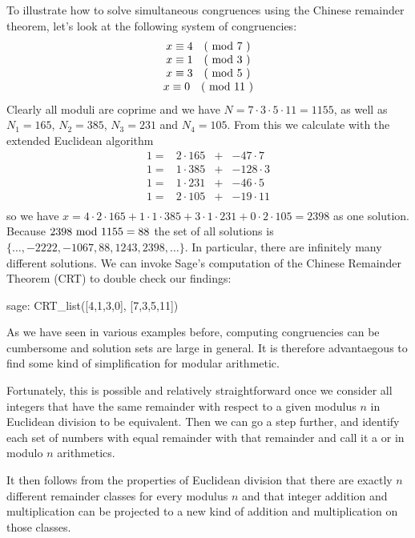 \begin{example} To illustrate how to solve simultaneous congruences using the Chinese remainder theorem, let's look at the following system of congruencies:
$$
\begin{array}{c}
x \equiv 4 \quad \text{( mod } 7 \text{ )} \\
x \equiv 1 \quad \text{( mod } 3 \text{ )} \\
x \equiv 3 \quad \text{( mod } 5 \text{ )} \\
x \equiv 0 \quad \text{( mod } 11 \text{ )} \\
\end{array}
$$
Clearly all moduli are coprime and we have $ N = 7 \cdot 3 \cdot 5 \cdot 11 = 1155 $, as well as
$ N_1 = 165 $, $ N_2 = 385 $, $ N_3 = 231 $ and $ N_4 = 105 $. From this we calculate with the extended Euclidean algorithm
$$
\begin{array}{cccc}
 1 = & 2 \cdot 165  & + & -47 \cdot 7 \\
 1 = & 1 \cdot 385  & + &  -128 \cdot 3 \\
 1 = & 1 \cdot 231  & + &  -46 \cdot 5 \\
 1 = & 2 \cdot 105  & + &  -19 \cdot 11 \\
\end{array}
$$
so we have
$x = 4 \cdot 2 \cdot 165 + 1 \cdot 1 \cdot 385 + 3 \cdot 1 \cdot 231 + 0 \cdot 2 \cdot 105 = 2398$
as one solution. Because $ 2398 \text{ mod } 1155 = 88 $ the set of all solutions is
$ \{\ldots, -2222, -1067,88,1243, 2398, \ldots \} $. In particular, there are infinitely many different solutions. We can invoke Sage's computation of the Chinese Remainder Theorem (CRT) to double check our findings:
\begin{sagecommandline}
sage: CRT_list([4,1,3,0], [7,3,5,11])
\end{sagecommandline}
\end{example}
As we have seen in various examples before, computing congruencies can be cumbersome and solution sets are large in general. It is therefore advantaegous to find some kind of simplification for modular arithmetic. 

Fortunately, this is possible and relatively straightforward once we consider all integers that have the same remainder with respect to a given modulus $n$ in Euclidean division to be equivalent. Then we can go a step further, and identify each set of numbers with equal remainder with that remainder and call it a  or  in modulo $n$ arithmetics. 

It then follows from the properties of Euclidean division that there are exactly $ n $ different remainder classes for every modulus $n$ and that integer addition and multiplication can be projected to a new kind of addition and multiplication on those classes. 

